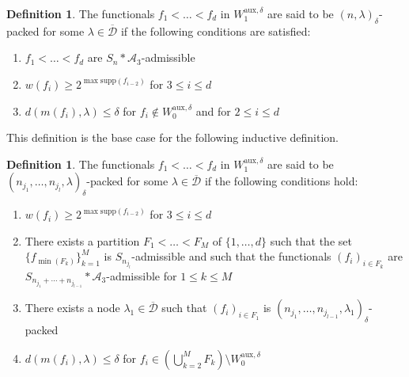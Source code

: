 \documentclass[12pt,a4paper]{amsart}
\newcommand{\supp}{\text{supp}}
\theoremstyle{definition}
\newtheorem{definition}[question]{Definition}
\theoremstyle{plain}
\begin{document}
\begin{definition}{\label{delta_packed}}
The functionals $f_{1}<\ldots<f_{d}$ in $W^{\text{aux},\delta}_{1}$ are said to be $(n,\lambda)_{\delta}$-packed for some $\lambda\in\overline{\mathcal{D}}$ if the following conditions are satisfied:
\begin{enumerate}
\item $f_{1}<\ldots<f_{d}$ are $S_{n}\ast\mathcal{A}_{3}$-admissible
\item $w(f_{i})\geq 2^{\max\supp(f_{i-2})}$ for $3\leq i\leq d$
\item $d(m(f_{i}),\lambda)\leq\delta$ for $f_{i}\notin W^{\text{aux},\delta}_{0}$ and for $2\leq i\leq d$
\end{enumerate}
\end{definition}

This definition is the base case for the following inductive definition.

\begin{definition}{\label{big_delta_packed}}
The functionals $f_{1}<\ldots<f_{d}$ in $W^{\text{aux},\delta}_{1}$ are said to be $(n_{j_{1}},\ldots,n_{j_{l}},\lambda)_{\delta}$-packed for some $\lambda\in\overline{\mathcal{D}}$ if the following conditions hold:
\begin{enumerate}
\item $w(f_{i})\geq 2^{\max\supp(f_{i-2})}$ for $3\leq i\leq d$
\item There exists a partition $F_{1}<\ldots<F_{M}$ of $\{1,\ldots,d\}$ such that the set $\{f_{\min(F_{k})}\}_{k=1}^{M}$ is $S_{n_{j_{l}}}$-admissible and such that the functionals $(f_{i})_{i\in F_{k}}$ are $S_{n_{j_{1}}+\cdots+n_{j_{l-1}}}\ast\mathcal{A}_{3}$-admissible for $1\leq k\leq M$
\item There exists a node $\lambda_{1}\in\overline{\mathcal{D}}$ such that $(f_{i})_{i\in F_{1}}$ is $(n_{j_{1}},\ldots,n_{j_{l-1}},\lambda_{1})_{\delta}$-packed
\item $d(m(f_{i}),\lambda)\leq\delta$ for $f_{i}\in\left(\bigcup_{k=2}^{M}F_{k}\right)\setminus W^{\text{aux},\delta}_{0}$
\end{enumerate}
\end{definition}
\end{document}
